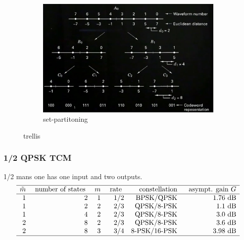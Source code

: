 \begin{figure}[hbt!]
    \centering
    \begin{subfigure}[t]{0.49\linewidth}
        \includegraphics[width=1\textwidth]{images/trellis/trellis_example5.jpg}
        \caption{set-partitoning}\label{subfig:set_partitioning}
    \end{subfigure}
\caption{trellis}
\label{fig:ex_trellis}
\end{figure}
\FloatBarrier 
\subsubsection{1/2 QPSK TCM}
1/2 mans one has one input and two outputs.
\begin{equation}
    \begin{array}{rrrrrr}
    \hline \tilde{m} & \text { number of states } & m & \text { rate } & \text { constellation } & \text { asympt. gain } G \\
    \hline 1 & 2 & 1 & 1 / 2 & \text { BPSK/QPSK } & 1.76 \mathrm{~dB} \\
    1 & 2 & 2 & 2 / 3 & \text { QPSK/8-PSK } & 1.1 \mathrm{~dB}  \\
    1 & 4 & 2 & 2 / 3 & \text { QPSK/8-PSK } & 3.0 \mathrm{~dB}   \\
    2 & 8 & 2 & 2 / 3 & \text { QPSK/8-PSK } & 3.6 \mathrm{~dB}   \\
    2 & 8 & 3 & 3 / 4 & 8 \text {-PSK/16-PSK } & 3.98 \mathrm{~dB}  \\
    \hline
    \end{array}
\end{equation}
